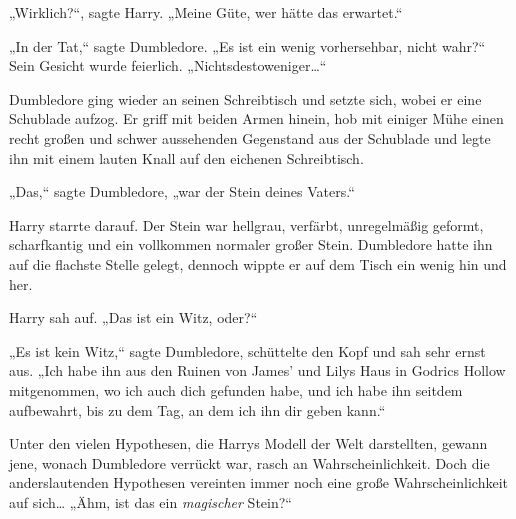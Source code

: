 „Wirklich?“, sagte Harry. „Meine Güte, wer hätte das erwartet.“

„In der Tat,“ sagte Dumbledore. „Es ist ein wenig vorhersehbar, nicht wahr?“ Sein Gesicht wurde feierlich. „Nichtsdestoweniger…“

Dumbledore ging wieder an seinen Schreibtisch und setzte sich, wobei er eine Schublade aufzog. Er griff mit beiden Armen hinein, hob mit einiger Mühe einen recht großen und schwer aussehenden Gegenstand aus der Schublade und legte ihn mit einem lauten Knall auf den eichenen Schreibtisch.

„Das,“ sagte Dumbledore, „war der Stein deines Vaters.“

Harry starrte darauf. Der Stein war hellgrau, verfärbt, unregelmäßig geformt, scharfkantig und ein vollkommen normaler großer Stein. Dumbledore hatte ihn auf die flachste Stelle gelegt, dennoch wippte er auf dem Tisch ein wenig hin und her.

Harry sah auf. „Das ist ein Witz, oder?“

„Es ist kein Witz,“ sagte Dumbledore, schüttelte den Kopf und sah sehr ernst aus. „Ich habe ihn aus den Ruinen von James’ und Lilys Haus in Godrics Hollow mitgenommen, wo ich auch dich gefunden habe, und ich habe ihn seitdem aufbewahrt, bis zu dem Tag, an dem ich ihn dir geben kann.“

Unter den vielen Hypothesen, die Harrys Modell der Welt darstellten, gewann jene, wonach Dumbledore verrückt war, rasch an Wahrscheinlichkeit. Doch die anderslautenden Hypothesen vereinten immer noch eine große Wahrscheinlichkeit auf sich… „Ähm, ist das ein \emph{magischer} Stein?“

